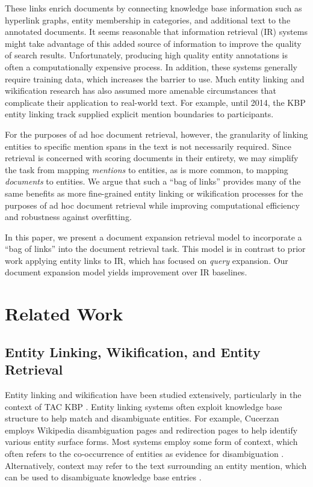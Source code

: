 \documentclass{sig-alternate}
\begin{document}
These links enrich documents by connecting knowledge base information such as hyperlink graphs, entity membership in categories, and additional text to the annotated documents. It seems reasonable that information retrieval (IR) systems might take advantage of this added source of information to improve the quality of search results. Unfortunately, producing high quality entity annotations is often a computationally expensive process. In addition, these systems generally require training data, which increases the barrier to use. Much entity linking and wikification research has also assumed more amenable circumstances that complicate their application to real-world text. For example, until 2014, the KBP entity linking track supplied explicit mention boundaries to participants.

For the purposes of ad hoc document retrieval, however, the granularity of linking entities to specific mention spans in the text is not necessarily required. Since retrieval is concerned with scoring documents in their entirety, we may simplify the task from mapping \textit{mentions} to entities, as is more common, to mapping \textit{documents} to entities. We argue that such a ``bag of links'' provides many of the same benefits as more fine-grained entity linking or wikification processes for the purposes of ad hoc document retrieval while improving computational efficiency and robustness against overfitting. 

In this paper, we present a document expansion retrieval model to incorporate a ``bag of links'' into the document retrieval task. This model is in contrast to prior work applying entity links to IR, which has focused on \textit{query} expansion. Our document expansion model yields improvement over IR baselines.

\section{Related Work}\label{section.related}

\subsection{Entity Linking, Wikification, and Entity Retrieval}\label{section.related.entities}

Entity linking and wikification have been studied extensively, particularly in the context of TAC KBP \cite{Ji2014}. Entity linking systems often exploit knowledge base structure to help match and disambiguate entities. For example, Cucerzan \cite{Cucerzan2007} employs Wikipedia disambiguation pages and redirection pages to help identify various entity surface forms. Most systems employ some form of context, which often refers to the co-occurrence of entities as evidence for disambiguation \cite{Stoyanov2012, Dalton2013}. Alternatively, context may refer to the text surrounding an entity mention, which can be used to disambiguate knowledge base entries \cite{Mihalcea2007, Dalton2013}.
\end{document}
